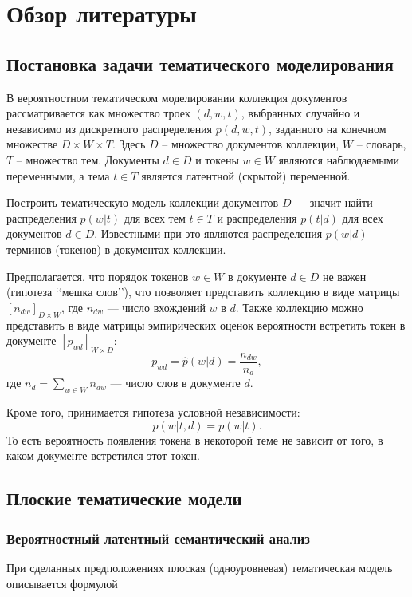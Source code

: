 \chapter{Обзор литературы}

\section{Постановка задачи тематического моделирования}
В вероятностном тематическом моделировании коллекция документов рассматривается как множество троек $(d, w, t)$, выбранных случайно и независимо из дискретного распределения $p(d, w, t)$, заданного на конечном множестве $D \times W \times T$. Здесь $D$ -- множество документов коллекции, $W$ -- словарь, $T$ -- множество тем. Документы $d \in  D$ и токены $w \in W$ являются наблюдаемыми переменными, а тема $t \in T$ является латентной (скрытой) переменной.

Построить тематическую модель коллекции документов $D$ — значит найти
распределения $p(w |t)$ для всех тем $t \in T$ и распределения $p(t| d)$  для всех документов $d \in  D$. Известными при это являются распределения $p(w|d)$ терминов 
(токенов) в документах коллекции.

Предполагается, что порядок токенов $w \in W$ в документе $d \in D$ не важен (гипотеза \lq\lq{мешка слов}\rq\rq{}), что позволяет представить коллекцию в виде матрицы $[n_{dw} ]_{D \times W}$, где $n_{dw}$ --- число вхождений $w$ в $d$. Также коллекцию можно представить в виде матрицы эмпирических оценок вероятности встретить токен в документе $[p_{wd}]_{W\times D}$:
	$$p_{wd}=\hat p(w|d) = \dfrac {n_{dw}}{n_d},$$
 	где $n_d = \sum\limits_{w \in W} n_{dw}$ --- число слов в документе $d$. 

Кроме того, принимается гипотеза условной независимости: $$p(w|t,d)=p(w|t).$$ То есть вероятность появления токена в некоторой теме не зависит от того, в каком документе встретился этот токен.

\section{Плоские тематические модели}

\subsection{Вероятностный латентный семантический анализ}

При сделанных предположениях плоская (одноуровневая) тематическая модель описывается формулой 


